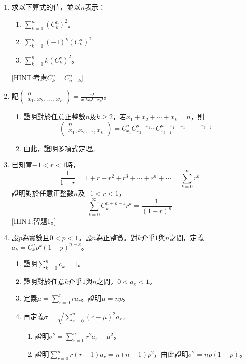 \documentclass[12pt]{article}
\begin{document}
\begin{enumerate}
        [HINT:考慮$(1+x)^{p+q}=(1+x)^p(1+x)^q$]
        \item 求以下算式的值，並以$n$表示：\begin{enumerate}
            \item $\sum_{k=0}^{n}(C_k^n)^2$。
            \item $\sum_{k=0}^{n}(-1)^k(C_k^n)^2$
            \item $\sum_{k=0}^{n}k(C_k^n)^2$。
        \end{enumerate}
        [HINT:考慮$C_k^n=C_{n-k}^n$]
        \item 記$\begin{pmatrix}
            n\\x_1,x_2,\dots,x_k
        \end{pmatrix}=\frac{n!}{x_1!x_2!\cdots x_k!}$。\begin{enumerate}
            \item 證明對於任意正整數$n$及$k\geq 2$，若$x_1+x_2+\cdots+x_k=n$，則$$\begin{pmatrix}
                n\\x_1,x_2,\dots,x_k
            \end{pmatrix}=C_{x_1}^n C_{x_2}^{n-x_1}\cdots C_{x_{k-1}}^{n-x_1-x_2-\cdots-x_{k-2}}$$
            \item 由此，證明多項式定理。
        \end{enumerate}
        \item 已知當$-1<r<1$時，$$\frac{1}{1-r}=1+r+r^2+r^3+\cdots+r^n+\cdots=\sum_{k=0}^{\infty}r^k$$證明對於任意正整數$n$及$-1<r<1$，$$\sum_{k=0}^\infty C_k^{n+k-1}r^k=\frac{1}{(1-r)^n}$$[HINT:習題1。]
        \item 設$p$為實數且$0<p<1$。設$n$為正整數。對$k$介乎$1$與$n$之間，定義$a_k=C_k^n p^k(1-p)^{n-k}$。\begin{enumerate}
            \item 證明$\sum_{k=0}^{n}a_k=1$。
            \item 證明對於任意$k$介乎$1$與$n$之間，$0<a_k<1$。
            \item 定義$\mu=\sum_{r=0}^{n}ra_r$。證明$\mu=np$。
            \item 再定義$\sigma=\sqrt{\sum_{r=0}^n (r-\mu)^2a_r}$。\begin{enumerate}
                \item 證明$\sigma^2=\sum_{r=0}^{n}r^2a_r-\mu^2$。
                \item 證明$\sum_{r=0}^{n}r(r-1)a_r=n(n-1)p^2$，由此證明$\sigma^2=np(1-p)$。
            \end{enumerate}
        \end{enumerate}
    \end{enumerate}
\end{document}
